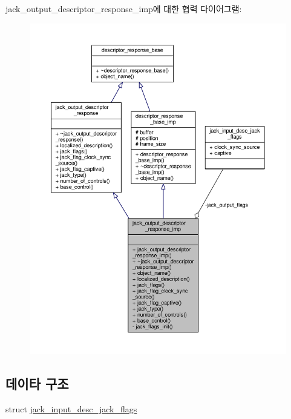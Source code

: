 jack\+\_\+output\+\_\+descriptor\+\_\+response\+\_\+imp에 대한 협력 다이어그램\+:
\nopagebreak
\begin{figure}[H]
\begin{center}
\leavevmode
\includegraphics[width=350pt]{classavdecc__lib_1_1jack__output__descriptor__response__imp__coll__graph}
\end{center}
\end{figure}
\subsection*{데이타 구조}
\begin{DoxyCompactItemize}
\item 
struct \hyperlink{structavdecc__lib_1_1jack__output__descriptor__response__imp_1_1jack__input__desc__jack__flags}{jack\+\_\+input\+\_\+desc\+\_\+jack\+\_\+flags}
\end{DoxyCompactItemize}
